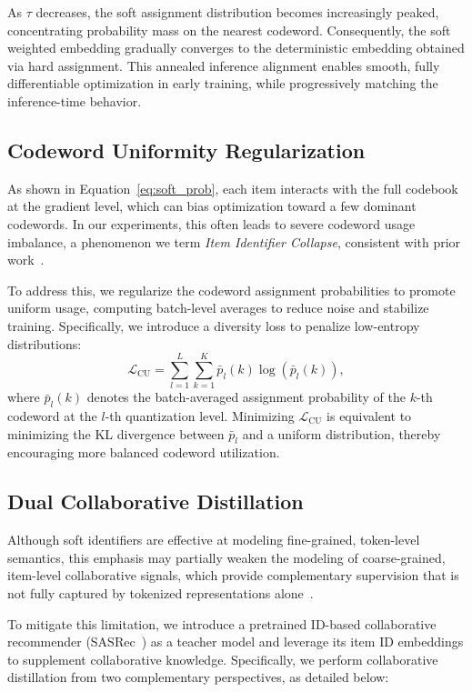As $\tau$ decreases, the soft assignment distribution becomes increasingly peaked, concentrating probability mass on the nearest codeword. Consequently, the soft weighted embedding gradually converges to the deterministic embedding obtained via hard assignment. This annealed inference alignment enables smooth, fully differentiable optimization in early training, while progressively matching the inference-time behavior.

\subsection{Codeword Uniformity Regularization}

As shown in Equation~\eqref{eq:soft_prob}, each item interacts with the full codebook at the gradient level, which can bias optimization toward a few dominant codewords. In our experiments, this often leads to severe codeword usage imbalance, a phenomenon we term \emph{Item Identifier Collapse}, consistent with prior work~\cite{EdVAE,Zhu_2025_ICCV}. 

To address this, we regularize the codeword assignment probabilities to promote uniform usage, computing batch-level averages to reduce noise and stabilize training. Specifically, we introduce a diversity loss to penalize low-entropy distributions:
\begin{equation}\label{eq:CU}
    \mathcal{L}_\text{CU} = \sum_{l=1}^{L} \sum_{k=1}^{K} \bar{p}_l(k) \log (\bar{p}_l(k)),
\end{equation}
where $\bar{p}_l(k)$ denotes the batch-averaged assignment probability of the $k$-th codeword at the $l$-th quantization level. Minimizing $\mathcal{L}_\text{CU}$ is equivalent to minimizing the KL divergence between $\bar{p}_l$ and a uniform distribution, thereby encouraging more balanced codeword utilization.

\subsection{Dual Collaborative Distillation}

Although soft identifiers are effective at modeling fine-grained, token-level semantics, this emphasis may partially weaken the modeling of coarse-grained, item-level collaborative signals, which provide complementary supervision that is not fully captured by tokenized representations alone~\cite{LETTER,DiscRec}. 

To mitigate this limitation, we introduce a pretrained ID-based collaborative recommender (SASRec~\cite{SASRec}) as a teacher model and leverage its item ID embeddings to supplement collaborative knowledge.
Specifically, we perform collaborative distillation from two complementary perspectives, as detailed below:


